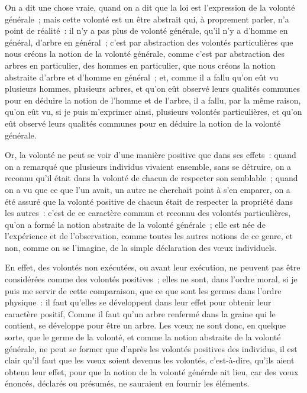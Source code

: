 \documentclass[french,twoside]{book} %
\newcommand\chaptercont{} %
\begin{document}
\chaptercont
\noindent On a dit une chose vraie, quand on a dit que la loi est l’expression de la volonté générale ; mais cette volonté est un être abstrait qui, à proprement parler, n’a point de réalité : il n’y a pas plus de volonté générale, qu’il n’y a d’homme en général, d’arbre en général ; c’est par abstraction des volontés particulières que nous créons la notion de la volonté générale, comme c’est par abstraction des arbres en particulier, des hommes en particulier, que nous créons la notion abstraite d’arbre et d’homme en général ; et, comme il a fallu qu’on eût vu plusieurs hommes, plusieurs arbres, et qu’on eût observé leurs qualités communes pour en déduire la notion de l’homme et de l’arbre, il a fallu, par la même raison, qu’on eût vu, si je puis m’exprimer ainsi, plusieurs volontés particulières, et qu’on eût observé leurs qualités communes pour en déduire la notion de la volonté générale.\par
Or, la volonté ne peut se voir d’une manière positive que dans ses effets : quand on a remarqué que plusieurs individus vivaient ensemble, sans se détruire, on a reconnu qu’il était dans la volonté de chacun de respecter son semblable ; quand on a vu que ce que l’un avait, un autre ne cherchait point à s’en emparer, on a été assuré que la volonté positive de chacun était de respecter la propriété dans les autres : c’est de ce caractère commun et reconnu des volontés particulières, qu’on a formé la notion abstraite de la volonté générale ; elle est née de l’expérience et de l’observation, comme toutes les autres notions de ce genre, et non, comme on se l’imagine, de la simple déclaration des vœux individuels.\par
En effet, des volontés non exécutées, ou avant leur exécution, ne peuvent pas être considérées comme des volontés positives ; elles ne sont, dans l’ordre moral, si je puis me servir de cette comparaison, que ce que sont les germes dans l’ordre physique : il faut qu’elles se développent dans leur effet pour obtenir leur caractère positif, Comme il faut qu’un arbre renfermé dans la graine qui le contient, se développe pour être un arbre. Les vœux ne sont donc, en quelque sorte, que le germe de la volonté, et comme la notion abstraite de la volonté générale, ne peut se former que d’après les volontés positives des individus, il est clair qu’il faut que les vœux soient devenus les volontés, c’est-à-dire, qu’ils aient obtenu leur effet, pour que la notion de la volonté générale ait lieu, car des vœux énoncés, déclarés ou présumés, ne sauraient en fournir les éléments.\par
\end{document}
